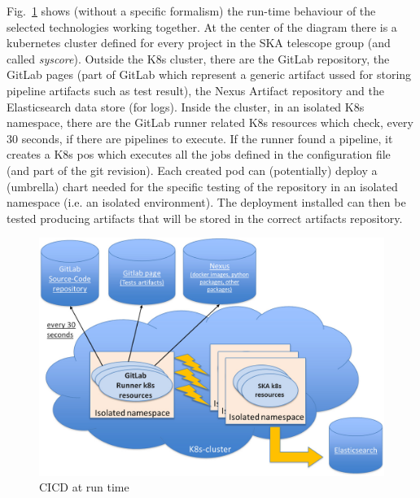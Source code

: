 \documentclass[a4paper]{spie}  %
\begin{document}
Fig.~\ref{fig:cicdruntime} shows (without a specific formalism) the run-time behaviour of the selected technologies working together. At the center of the diagram there is a kubernetes cluster defined for every project in the SKA telescope group (and called \textit{syscore}). Outside the K8s cluster, there are the GitLab repository, the GitLab pages (part of GitLab which represent a generic artifact ussed for storing pipeline artifacts such as test result), the Nexus Artifact repository\cite{nexus} and the Elasticsearch\cite{elastcsearch} data store (for logs). 
Inside the cluster, in an isolated K8s namespace, there are the GitLab runner related K8s resources which check, every 30 seconds, if there are pipelines to execute. If the runner found a pipeline, it creates a K8s pos which executes all the jobs defined in the configuration file (and part of the git revision). Each created pod can (potentially) deploy a (umbrella) chart needed for the specific testing of the repository in an isolated namespace (i.e. an isolated environment). The deployment installed can then be tested producing artifacts that will be stored in the correct artifacts repository.

\begin{figure}[!htb]
   \centering
   \includegraphics*[width=0.8\columnwidth]{CICD runtime}
   \caption{CICD at run time}
   \label{fig:cicdruntime}
\end{figure}
\end{document}
